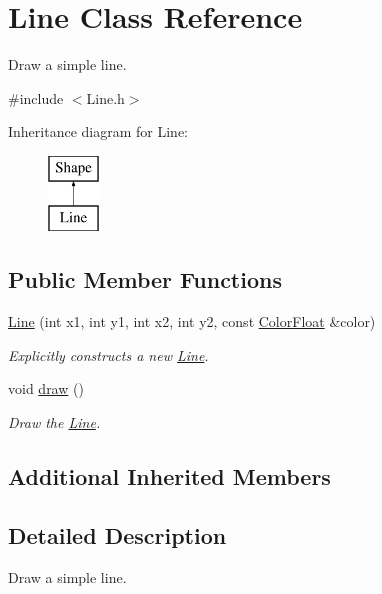 \hypertarget{class_line}{\section{Line Class Reference}
\label{class_line}
}


Draw a simple line.  




{\ttfamily \#include $<$Line.\+h$>$}

Inheritance diagram for Line\+:\begin{figure}[H]
\begin{center}
\leavevmode
\includegraphics[height=2.000000cm]{class_line}
\end{center}
\end{figure}
\subsection*{Public Member Functions}
\begin{DoxyCompactItemize}
\item 
\hyperlink{class_line_a01fd5349b9a19b2b2ca24a7c7f0e9e9e}{Line} (int x1, int y1, int x2, int y2, const \hyperlink{struct_color_float}{Color\+Float} \&color)
\begin{DoxyCompactList}\small\item\em Explicitly constructs a new \hyperlink{class_line}{Line}. \end{DoxyCompactList}\item 
void \hyperlink{class_line_ab6265993bf5acbc28830181c3e712f10}{draw} ()
\begin{DoxyCompactList}\small\item\em Draw the \hyperlink{class_line}{Line}. \end{DoxyCompactList}\end{DoxyCompactItemize}
\subsection*{Additional Inherited Members}


\subsection{Detailed Description}
Draw a simple line. 

